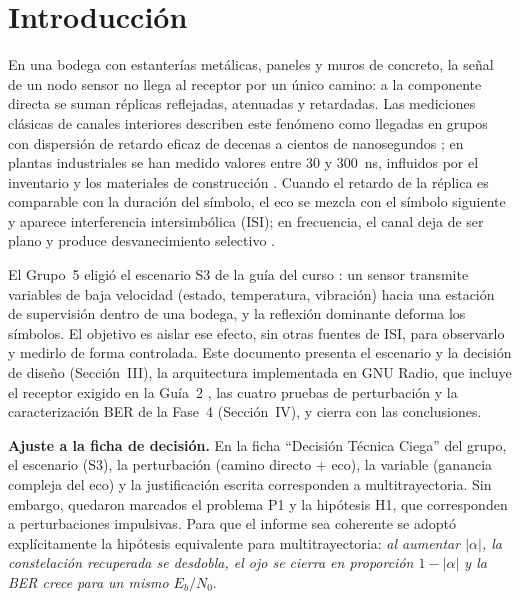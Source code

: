 \section{Introducción}
En una bodega con estanterías metálicas, paneles y muros de concreto, la señal de un nodo sensor no llega al receptor por un único camino: a la componente directa se suman réplicas reflejadas, atenuadas y retardadas. Las mediciones clásicas de canales interiores describen este fenómeno como llegadas en grupos con dispersión de retardo eficaz de decenas a cientos de nanosegundos \cite{saleh1987,hashemi1993}; en plantas industriales se han medido valores entre 30 y 300~ns, influidos por el inventario y los materiales de construcción \cite{rappaport1989}. Cuando el retardo de la réplica es comparable con la duración del símbolo, el eco se mezcla con el símbolo siguiente y aparece interferencia intersimbólica (ISI); en frecuencia, el canal deja de ser plano y produce desvanecimiento selectivo \cite{proakis2008,rappaport2002}.

El Grupo~5 eligió el escenario S3 de la guía del curso \cite{guia1}: un sensor transmite variables de baja velocidad (estado, temperatura, vibración) hacia una estación de supervisión dentro de una bodega, y la reflexión dominante deforma los símbolos. El objetivo es aislar ese efecto, sin otras fuentes de ISI, para observarlo y medirlo de forma controlada. Este documento presenta el escenario y la decisión de diseño (Sección~III), la arquitectura implementada en GNU Radio, que incluye el receptor exigido en la Guía~2 \cite{guia2}, las cuatro pruebas de perturbación y la caracterización BER de la Fase~4 \cite{guia4} (Sección~IV), y cierra con las conclusiones.

\textbf{Ajuste a la ficha de decisión.} En la ficha ``Decisión Técnica Ciega'' del grupo, el escenario (S3), la perturbación (camino directo + eco), la variable (ganancia compleja del eco) y la justificación escrita corresponden a multitrayectoria. Sin embargo, quedaron marcados el problema P1 y la hipótesis H1, que corresponden a perturbaciones impulsivas. Para que el informe sea coherente se adoptó explícitamente la hipótesis equivalente para multitrayectoria: \emph{al aumentar $|\alpha|$, la constelación recuperada se desdobla, el ojo se cierra en proporción $1-|\alpha|$ y la BER crece para un mismo $E_b/N_0$}.
